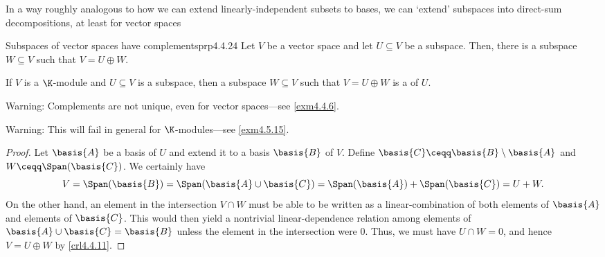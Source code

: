 In a way roughly analogous to how we can extend linearly-independent subsets to bases, we can `extend' subspaces into direct-sum decompositions, at least for vector spaces
\begin{prp}{Subspaces of vector spaces have complements}{prp4.4.24}
	Let $V$ be a vector space and let $U\subseteq V$ be a subspace.  Then, there is a subspace $W\subseteq V$ such that $V=U\oplus W$.
	\begin{rmk}
		If $V$ is a $\K$-module and $U\subseteq V$ is a subspace, then a subspace $W\subseteq V$ such that $V=U\oplus W$ is a  of $U$.
	\end{rmk}
	\begin{rmk}
		Warning:  Complements are not unique, even for vector spaces---see \cref{exm4.4.6}.
	\end{rmk}
	\begin{rmk}
		Warning:  This will fail in general for $\K$-modules---see \cref{exm4.5.15}.
	\end{rmk}
	\begin{proof}
		Let $\basis{A}$ be a basis of $U$ and extend it to a basis $\basis{B}$ of $V$.  Define $\basis{C}\ceqq \basis{B}\setminus \basis{A}$ and $W\ceqq \Span (\basis{C})$.  We certainly have
		\begin{equation}
			V=\Span (\basis{B})=\Span (\basis{A}\cup \basis{C})=\Span (\basis{A})+\Span (\basis{C})=U+W.
		\end{equation}
		On the other hand, an element in the intersection $V\cap W$ must be able to be written as a linear-combination of both elements of $\basis{A}$ and elements of $\basis{C}$.  This would then yield a nontrivial linear-dependence relation among elements of $\basis{A}\cup \basis{C}=\basis{B}$ unless the element in the intersection were $0$.  Thus, we must have $U\cap W=0$, and hence $V=U\oplus W$ by \cref{crl4.4.11}.
	\end{proof}
\end{prp}

